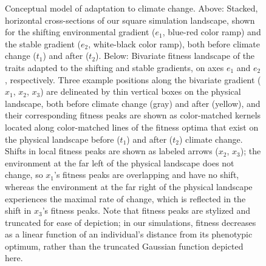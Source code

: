 \documentclass[9pt,twocolumn,twoside,lineno]{pnas-new}
\begin{document}
\begin{figure}
    \caption{Conceptual model of adaptation to climate change. Above: Stacked, horizontal cross-sections of our square simulation landscape, shown for the shifting environmental gradient ($e_{1}$, blue-red color ramp) and the stable gradient ($e_{2}$, white-black color ramp), both before climate change ($t_{1}$) and after ($t_{2}$). Below: Bivariate fitness landscape of the traits adapted to the shifting and stable gradients, on axes $e_{1}$ and $e_{2}$, respectively. Three example positions along the bivariate gradient ($x_{1}$, $x_{2}$, $x_{3}$) are delineated by thin vertical boxes on the physical landscape, both before climate change (gray) and after (yellow), and their corresponding fitness peaks are shown as color-matched kernels located along color-matched lines of the fitness optima that exist on the physical landscape before ($t_{1}$) and after ($t_{2}$) climate change. Shifts in local fitness peaks are shown as labeled arrows ($x_{2}$, $x_{3}$); the environment at the far left of the physical landscape does not change, so $x_{1}$'s fitness peaks are overlapping and have no shift, whereas the environment at the far right of the physical landscape experiences the maximal rate of change, which is reflected in the shift in $x_{3}$'s fitness peaks. Note that fitness peaks are stylized and truncated for ease of depiction; in our simulations, fitness decreases as a linear function of an individual's distance from its phenotypic optimum, rather than the truncated Gaussian function depicted here.}
\label{fig:fig_1}
\end{figure}
\end{document}
